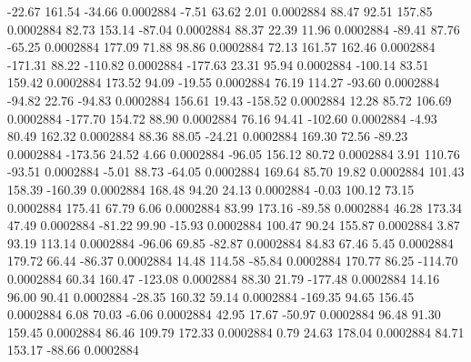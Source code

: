       -22.67      161.54      -34.66     0.0002884
       -7.51       63.62        2.01     0.0002884
       88.47       92.51      157.85     0.0002884
       82.73      153.14      -87.04     0.0002884
       88.37       22.39       11.96     0.0002884
      -89.41       87.76      -65.25     0.0002884
      177.09       71.88       98.86     0.0002884
       72.13      161.57      162.46     0.0002884
     -171.31       88.22     -110.82     0.0002884
     -177.63       23.31       95.94     0.0002884
     -100.14       83.51      159.42     0.0002884
      173.52       94.09      -19.55     0.0002884
       76.19      114.27      -93.60     0.0002884
      -94.82       22.76      -94.83     0.0002884
      156.61       19.43     -158.52     0.0002884
       12.28       85.72      106.69     0.0002884
     -177.70      154.72       88.90     0.0002884
       76.16       94.41     -102.60     0.0002884
       -4.93       80.49      162.32     0.0002884
       88.36       88.05      -24.21     0.0002884
      169.30       72.56      -89.23     0.0002884
     -173.56       24.52        4.66     0.0002884
      -96.05      156.12       80.72     0.0002884
        3.91      110.76      -93.51     0.0002884
       -5.01       88.73      -64.05     0.0002884
      169.64       85.70       19.82     0.0002884
      101.43      158.39     -160.39     0.0002884
      168.48       94.20       24.13     0.0002884
       -0.03      100.12       73.15     0.0002884
      175.41       67.79        6.06     0.0002884
       83.99      173.16      -89.58     0.0002884
       46.28      173.34       47.49     0.0002884
      -81.22       99.90      -15.93     0.0002884
      100.47       90.24      155.87     0.0002884
        3.87       93.19      113.14     0.0002884
      -96.06       69.85      -82.87     0.0002884
       84.83       67.46        5.45     0.0002884
      179.72       66.44      -86.37     0.0002884
       14.48      114.58      -85.84     0.0002884
      170.77       86.25     -114.70     0.0002884
       60.34      160.47     -123.08     0.0002884
       88.30       21.79     -177.48     0.0002884
       14.16       96.00       90.41     0.0002884
      -28.35      160.32       59.14     0.0002884
     -169.35       94.65      156.45     0.0002884
        6.08       70.03       -6.06     0.0002884
       42.95       17.67      -50.97     0.0002884
       96.48       91.30      159.45     0.0002884
       86.46      109.79      172.33     0.0002884
        0.79       24.63      178.04     0.0002884
       84.71      153.17      -88.66     0.0002884
